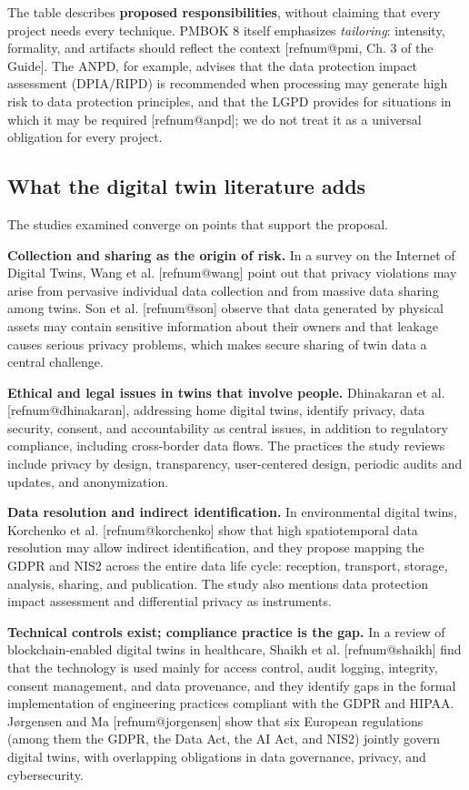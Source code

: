 \documentclass[11pt,a4paper]{article}
\makeatletter
\newcommand{\refnum}[1]{\csname refnum@#1\endcsname}
\makeatother
\begin{document}
The table describes \textbf{proposed responsibilities}, without claiming that every project needs every technique. PMBOK 8 itself emphasizes \textit{tailoring}: intensity, formality, and artifacts should reflect the context [\refnum{pmi}, Ch. 3 of the Guide]. The ANPD, for example, advises that the data protection impact assessment (DPIA/RIPD) is recommended when processing may generate high risk to data protection principles, and that the LGPD provides for situations in which it may be required [\refnum{anpd}]; we do not treat it as a universal obligation for every project.
\subsection{What the digital twin literature adds}

The studies examined converge on points that support the proposal.

\textbf{Collection and sharing as the origin of risk.} In a survey on the Internet of Digital Twins, Wang et al. [\refnum{wang}] point out that privacy violations may arise from pervasive individual data collection and from massive data sharing among twins. Son et al. [\refnum{son}] observe that data generated by physical assets may contain sensitive information about their owners and that leakage causes serious privacy problems, which makes secure sharing of twin data a central challenge.

\textbf{Ethical and legal issues in twins that involve people.} Dhinakaran et al. [\refnum{dhinakaran}], addressing home digital twins, identify privacy, data security, consent, and accountability as central issues, in addition to regulatory compliance, including cross-border data flows. The practices the study reviews include privacy by design, transparency, user-centered design, periodic audits and updates, and anonymization.

\textbf{Data resolution and indirect identification.} In environmental digital twins, Korchenko et al. [\refnum{korchenko}] show that high spatiotemporal data resolution may allow indirect identification, and they propose mapping the GDPR and NIS2 across the entire data life cycle: reception, transport, storage, analysis, sharing, and publication. The study also mentions data protection impact assessment and differential privacy as instruments.

\textbf{Technical controls exist; compliance practice is the gap.} In a review of blockchain-enabled digital twins in healthcare, Shaikh et al. [\refnum{shaikh}] find that the technology is used mainly for access control, audit logging, integrity, consent management, and data provenance, and they identify gaps in the formal implementation of engineering practices compliant with the GDPR and HIPAA. Jørgensen and Ma [\refnum{jorgensen}] show that six European regulations (among them the GDPR, the Data Act, the AI Act, and NIS2) jointly govern digital twins, with overlapping obligations in data governance, privacy, and cybersecurity.
\end{document}
